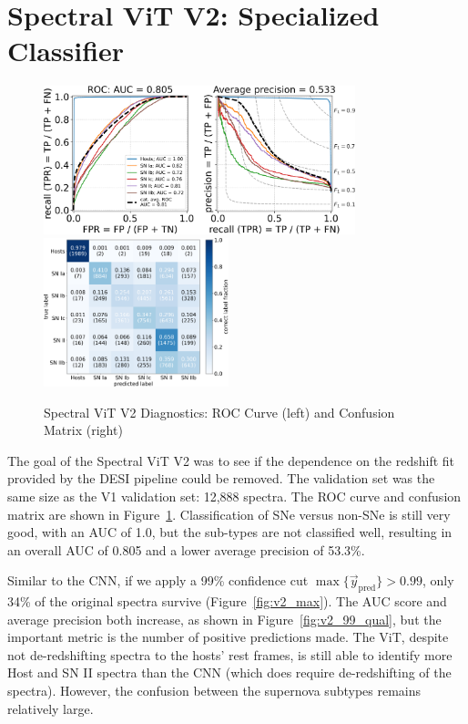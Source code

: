\section{Spectral ViT V2: Specialized Classifier}
\begin{figure}[b!]
    \centering
    \includegraphics[height=4.3cm]{figures/v2_real/vit_model_V2rocfulle_e26.png}
    \quad
    \includegraphics[height=4.3cm]{figures/v2_real/vit_model_V2cmfull_e26.png}
    \caption[Spectral ViT V2 Diagnostics]{Spectral ViT V2 Diagnostics: ROC Curve (left) and Confusion Matrix (right)\label{fig:v2_qual}}
\end{figure}
The goal of the Spectral ViT V2 was to see if the dependence on the redshift fit 
provided by the DESI pipeline could be removed. The validation set was the same size 
as the V1 validation set: 12,888 spectra. The ROC curve and confusion matrix are shown
in Figure~\ref{fig:v2_qual}. Classification of SNe versus non-SNe is still very good,
with an AUC of 1.0, but the sub-types are not classified well, resulting in 
an overall AUC of 0.805 and a lower average precision of 53.3\%. 


Similar to the CNN, if we apply a 99\% confidence cut $\max{\{\vec{y}_\mathrm{pred}\}}>0.99$, only 34\% of the original spectra
survive (Figure~\ref{fig:v2_max}). The AUC score and average precision both increase, as shown in Figure~\ref{fig:v2_99_qual}, 
but the important metric is the number of positive predictions made. The ViT, 
despite not de-redshifting spectra to the hosts' rest frames, is still able to identify more Host and SN II spectra than the CNN (which does require de-redshifting of the spectra). However, the confusion between the supernova subtypes remains relatively large.

